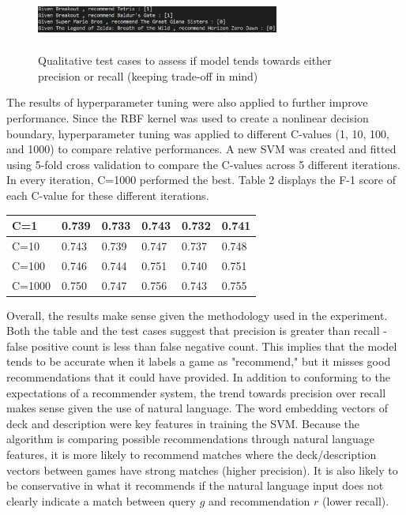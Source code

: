 \documentclass[10pt,twocolumn]{article}
\begin{document}
\begin{figure}[h!]
\includegraphics[width=8cm, height=2cm]{testcases_hyperparams_img.PNG}
\centering
\caption{Qualitative test cases to assess if model tends towards either precision or recall (keeping trade-off in mind)}
\end{figure}

The results of hyperparameter tuning were also applied to further improve performance. Since the RBF kernel was used to create a nonlinear decision boundary, hyperparameter tuning was applied to different C-values (1, 10, 100, and 1000) to compare relative performances. A new SVM was created and fitted using 5-fold cross validation to compare the C-values across 5 different iterations. In every iteration, C=1000 performed the best. Table 2 displays the F-1 score of each C-value for these different iterations.

\begin{center}
\begin{tabular}{ | m{5em} | m{1cm} | m{1cm}| m{1cm} | } 
  \hline
  C=1 & 0.739 & 0.733  & 0.743 & 0.732 & 0.741 \\ 
  \hline
  C=10 & 0.743 & 0.739 & 0.747 & 0.737 & 0.748 \\ 
  \hline
  C=100 & 0.746 & 0.744 & 0.751 & 0.740 & 0.751 \\ 
  \hline
  C=1000 & 0.750 & 0.747 & 0.756 & 0.743 & 0.755 \\
  \hline
\end{tabular}
\end{center}

Overall, the results make sense given the methodology used in the experiment. Both the table and the test cases suggest that precision is greater than recall - false positive count is less than false negative count. This implies that the model tends to be accurate when it labels a game as "recommend," but it misses good recommendations that it could have provided. In addition to conforming to the expectations of a recommender system, the trend towards precision over recall makes sense given the use of natural language. The word embedding vectors of deck and description were key features in training the SVM. Because the algorithm is comparing possible recommendations through natural language features, it is more likely to recommend matches where the deck/description vectors between games have strong matches (higher precision). It is also likely to be conservative in what it recommends if the natural language input does not clearly indicate a match between query $g$ and recommendation $r$ (lower recall).
\end{document}
